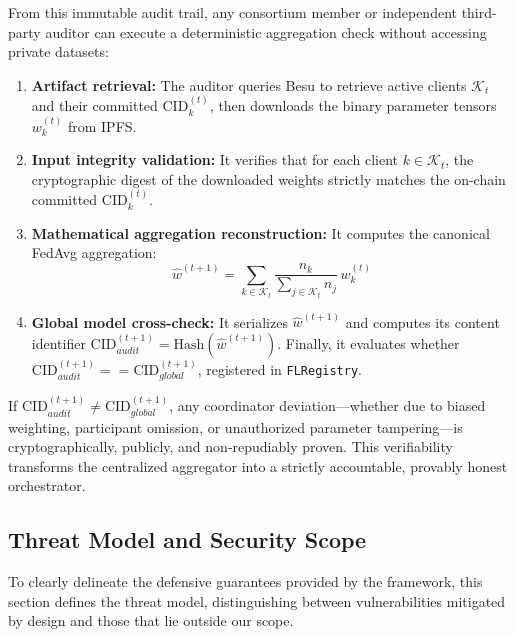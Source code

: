 From this immutable audit trail, any consortium member or independent third-party auditor can execute a deterministic aggregation check without accessing private datasets:
\begin{enumerate}
    \item \textbf{Artifact retrieval:} The auditor queries Besu to retrieve active clients $\mathcal{K}_t$ and their committed $\text{CID}_k^{(t)}$, then downloads the binary parameter tensors $w_k^{(t)}$ from IPFS.
    \item \textbf{Input integrity validation:} It verifies that for each client $k \in \mathcal{K}_t$, the cryptographic digest of the downloaded weights strictly matches the on-chain committed $\text{CID}_k^{(t)}$.
    \item \textbf{Mathematical aggregation reconstruction:} It computes the canonical FedAvg aggregation:
    \begin{equation}
    \hat{w}^{(t+1)} = \sum_{k \in \mathcal{K}_t} \frac{n_k}{\sum_{j \in \mathcal{K}_t} n_j} \, w_k^{(t)}
    \end{equation}
    \item \textbf{Global model cross-check:} It serializes $\hat{w}^{(t+1)}$ and computes its content identifier $\text{CID}_{audit}^{(t+1)} = \text{Hash}(\hat{w}^{(t+1)})$. Finally, it evaluates whether $\text{CID}_{audit}^{(t+1)} == \text{CID}_{global}^{(t+1)}$, registered in \texttt{FLRegistry}.
\end{enumerate}
If $\text{CID}_{audit}^{(t+1)} \neq \text{CID}_{global}^{(t+1)}$, any coordinator deviation—whether due to biased weighting, participant omission, or unauthorized parameter tampering—is cryptographically, publicly, and non-repudiably proven. This verifiability transforms the centralized aggregator into a strictly accountable, provably honest orchestrator.

\subsection{Threat Model and Security Scope}
\label{subsec:modelo_amenazas}
To clearly delineate the defensive guarantees provided by the framework, this section defines the threat model, distinguishing between vulnerabilities mitigated by design and those that lie outside our scope.

